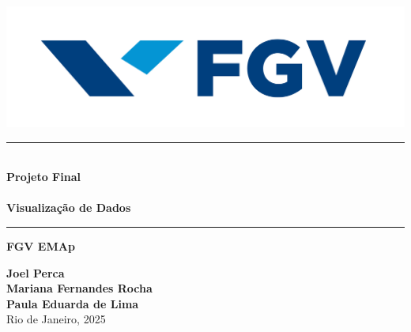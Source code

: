 \documentclass{article}
\begin{document}
\begin{titlepage}
    \begin{center}

        \vspace{1cm}
        \begin{minipage}{0.45\textwidth}
            \centering
            \includegraphics[width=1.2\textwidth]{logo_fgv.png}    
        \end{minipage}
        \vspace{2cm}

        \rule{1\textwidth}{0.4pt} \\ %
        \vspace{0.3cm}
        {\Huge \textbf{Projeto Final}} \\
        \vspace{0.2cm}
        \vspace{0.5cm}\\
        {\Large \textbf{Visualização de Dados}}\\
        \rule{1\textwidth}{0.4pt} %


        \vspace{0.5cm}
        {\Large \textbf{FGV EMAp}} \\
        \vspace{2cm}
        
        {\large 
            \textbf{Joel Perca}\\
            \textbf{Mariana Fernandes Rocha} \\
            \textbf{Paula Eduarda de Lima}}\\[1.5cm]
        
        
        \vfill
        {\large Rio de Janeiro, 2025}

        
    \end{center}
\end{titlepage}
\end{document}
